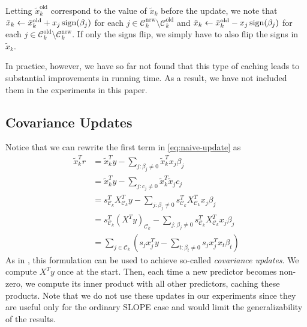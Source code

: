 Letting \(\tilde x_k^\text{old}\) correspond to the value of \(\tilde x_k\) before the update, we note that \(\tilde x_k \gets \tilde x_k^\text{old} + x_j \operatorname{sign}(\beta_j)\) for each \(j \in \mathcal{C}_k^\text{new} \setminus \mathcal{C}_k^\text{old}\) and \(\tilde x_k \gets \tilde x_k^\text{old} - x_j \operatorname{sign}(\beta_j)\) for each \(j \in \mathcal{C}_k^\text{old} \setminus \mathcal{C}_k^\text{new}\).
If only the signs flip, we simply have to also flip the signs in \(\tilde x_k\).

In practice, however, we have so far not found that this type of caching leads to substantial improvements in running time.
As a result, we have not included them in the experiments in this paper.

\subsection{Covariance Updates}

Notice that we can rewrite the first term in \eqref{eq:naive-update} as
\begin{equation}
  \begin{aligned}
    \tilde x_k^T r & = \tilde x_k^T y - \sum_{j : \beta_j \neq 0} \tilde x_k^T x_j \beta_j                                                                    \\
                   & = \tilde x_k^T y - \sum_{j : c_j \neq 0} \tilde x_k^T \tilde x_j c_j                                                                     \\
                   & = s_{\mathcal{C}_k}^T X_{\mathcal{C}_k}^T y - \sum_{j : \beta_j \neq 0} s_{\mathcal{C}_k}^T X_{\mathcal{C}_k}^T x_j \beta_j              \\
                   & = s_{\mathcal{C}_k}^T \left(X^T y\right)_{\mathcal{C}_k} - \sum_{j : \beta_j \neq 0} s_{\mathcal{C}_k}^T X_{\mathcal{C}_k}^T x_j \beta_j \\
                   & = \sum_{j \in \mathcal{C}_k}\left( s_j x_j^Ty - \sum_{t : \beta_t \neq 0} s_j x_j^T x_t \beta_t \right)
  \end{aligned}
\end{equation}
As in \textcite{friedman2010}, this formulation can be used to achieve so-called \emph{covariance updates}.
We compute \(X^T y\) once at the start.
Then, each time a new predictor becomes non-zero, we compute its inner product with all other predictors, caching these products.
Note that we do not use these updates in our experiments since they are useful only for the ordinary SLOPE case and would limit the generalizability of the results.
